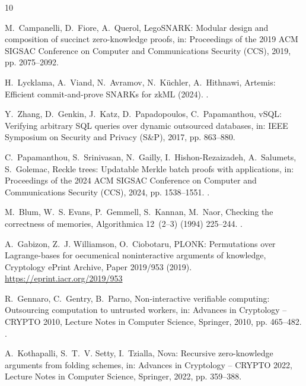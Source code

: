 \documentclass[5p,times,twocolumn]{elsarticle}
\begin{document}
\begin{thebibliography}{10}

M.~Campanelli, D.~Fiore, A.~Querol, {LegoSNARK}: Modular design and composition of succinct zero-knowledge proofs, in: Proceedings of the 2019 ACM SIGSAC Conference on Computer and Communications Security (CCS), 2019, pp. 2075--2092.

H.~Lycklama, A.~Viand, N.~Avramov, N.~K\"uchler, A.~Hithnawi, {Artemis}:
  Efficient commit-and-prove {SNARKs} for {zkML} (2024).
\newblock \href {http://arxiv.org/abs/2409.12055} {}.

Y.~Zhang, D.~Genkin, J.~Katz, D.~Papadopoulos, C.~Papamanthou, {vSQL}: Verifying arbitrary {SQL} queries over dynamic outsourced databases, in: IEEE Symposium on Security and Privacy (S\&P), 2017, pp. 863--880.

C.~Papamanthou, S.~Srinivasan, N.~Gailly, I.~Hishon-Rezaizadeh, A.~Salumets, S.~Golemac, Reckle trees: Updatable {Merkle} batch proofs with applications, in: Proceedings of the 2024 ACM SIGSAC Conference on Computer and Communications Security (CCS), 2024, pp. 1538--1551. \newblock \href {https://doi.org/10.1145/3658644.3670354} {}.

M.~Blum, W.~S. Evans, P.~Gemmell, S.~Kannan, M.~Naor, Checking the correctness of memories, Algorithmica 12~(2--3) (1994) 225--244. \newblock \href {https://doi.org/10.1007/BF01185212} {}.

A.~Gabizon, Z.~J. Williamson, O.~Ciobotaru, {PLONK}: Permutations over {Lagrange}-bases for oecumenical noninteractive arguments of knowledge, Cryptology ePrint Archive, Paper 2019/953 (2019). \newline\urlprefix\url{https://eprint.iacr.org/2019/953}

R.~Gennaro, C.~Gentry, B.~Parno, Non-interactive verifiable computing: Outsourcing computation to untrusted workers, in: Advances in Cryptology -- CRYPTO 2010, Lecture Notes in Computer Science, Springer, 2010, pp. 465--482. \newblock \href {https://doi.org/10.1007/978-3-642-14623-7_25} {}.


A.~Kothapalli, S.~T.~V. Setty, I.~Tzialla, {Nova}: Recursive zero-knowledge arguments from folding schemes, in: Advances in Cryptology -- CRYPTO 2022, Lecture Notes in Computer Science, Springer, 2022, pp. 359--388.



\end{thebibliography}
\end{document}
